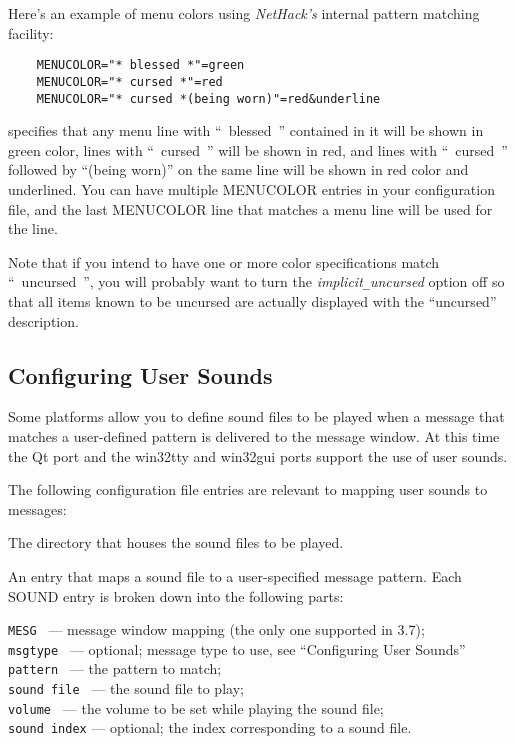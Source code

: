Here's an example of menu colors using {\it NetHack's\/} internal
pattern matching facility:

\begin{verbatim}
    MENUCOLOR="* blessed *"=green
    MENUCOLOR="* cursed *"=red
    MENUCOLOR="* cursed *(being worn)"=red&underline
\end{verbatim}

specifies that any menu line with ``~blessed~'' contained
in it will be shown in green color, lines with ``~cursed~'' will be
shown in red, and lines with ``~cursed~'' followed by ``(being worn)''
on the same line will be shown in red color and underlined.
You can have multiple MENUCOLOR entries in your configuration file,
and the last MENUCOLOR line that matches
a menu line will be used for the line.

Note that if you intend to have one or more color specifications match
``~uncursed~'', you will probably want to turn the
{\it implicit\verb+_+uncursed\/}
option off so that all items known to be uncursed are actually
displayed with the ``uncursed'' description.

\subsection*{Configuring User Sounds}

Some platforms allow you to define sound files to be played when a message
that matches a user-defined pattern is delivered to the message window.
At this time the Qt port and the win32tty and win32gui ports support the
use of user sounds.

The following configuration file entries are relevant to mapping user sounds
to messages:

\blist{}
\item[\ib{SOUNDDIR}]
The directory that houses the sound files to be played.
\item[\ib{SOUND}]
An entry that maps a sound file to a user-specified message pattern.
Each SOUND entry is broken down into the following parts:

{\tt MESG       } --- message window mapping (the only one supported in 3.7);\\
{\tt msgtype    } --- optional; message type to use, see ``Configuring User Sounds''\\
{\tt pattern    } --- the pattern to match;\\
{\tt sound file } --- the sound file to play;\\
{\tt volume     } --- the volume to be set while playing the sound file;\\
{\tt sound index} --- optional; the index corresponding to a sound file.
\elist


